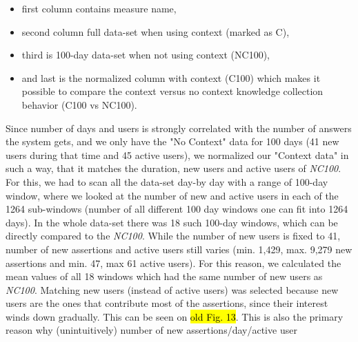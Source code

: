 \begin{itemize}
\item first column contains measure name,
\item second column full data-set when using context (marked as C),
\item third is 100-day data-set when not using context (NC100),
\item and last is the normalized column with context (C100) which makes it 
possible to compare the context versus no context knowledge collection behavior (C100 vs NC100).
\end{itemize}

Since number of days and users is strongly correlated with the number of 
answers the system gets, and we only have the "No Context" data for 100 days 
(41 new users during that time and 45 active users), we normalized our 
"Context data" in such a way, that it matches the duration, new users and 
active users of \emph{NC100}. For this, we had to scan all the data-set 
day-by day with a range of 100-day window, where we looked at the number of new 
and active users in each of the 1264 sub-windows (number of all different 
100 day windows one can fit into 1264 days). In the whole data-set there was 
18 such 100-day windows, which can be directly compared to the \emph{NC100}. 
While the number of new users is fixed to 41, number of new assertions and 
active users still varies (min. 1,429, max. 9,279 new assertions and min. 47, 
max 61 active users). For this reason, we calculated the mean values of all 
18 windows which had the same number of new users as \emph{NC100}. Matching 
new users (instead of active users) was selected because new users are the
ones that contribute most of the assertions, since their interest winds down 
gradually. This can be seen on \hl{old Fig. 13}. This is also the primary 
reason why (unintuitively) number of new assertions/day/active user 
